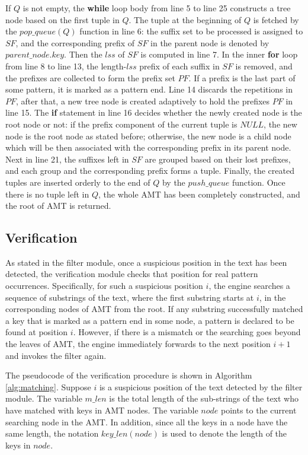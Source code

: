 \documentclass{article}
\begin{document}
If $Q$ is not empty, the \textbf{while} loop body from line 5 to line
25 constructs a tree node based on the first tuple in $Q$. The tuple
at the beginning of $Q$ is fetched by the $pop\_queue(Q)$ function in
line 6: the suffix set to be processed is assigned to $SF$, and the
corresponding prefix of $SF$ in the parent node is denoted by
$parent\_node.key$. Then the $lss$ of $SF$ is computed in line 7. In
the inner \textbf{for} loop from line 8 to line 13, the length-$lss$
prefix of each suffix in $SF$ is removed, and the prefixes are
collected to form the prefix set $PF$. If a prefix is the last part of
some pattern, it is marked as a pattern end. Line 14 discards the
repetitions in $PF$, after that, a new tree node is created adaptively
to hold the prefixes $PF$ in line 15. The \textbf{if} statement in
line 16 decides whether the newly created node is the root node or
not: if the prefix component of the current tuple is $NULL$, the new
node is the root node as stated before; otherwise, the new node is a
child node which will be then associated with the corresponding prefix
in its parent node. Next in line 21, the suffixes left in $SF$ are
grouped based on their lost prefixes, and each group and the
corresponding prefix forms a tuple. Finally, the created tuples are
inserted orderly to the end of $Q$ by the $push\_queue$ function. Once
there is no tuple left in $Q$, the whole AMT has been completely
constructed, and the root of AMT is returned.

\subsection{Verification}
\label{subsec:matching}

As stated in the filter module, once a suspicious position in the text
has been detected, the verification module checks that position for
real pattern occurrences. Specifically, for such a suspicious position
$i$, the engine searches a sequence of substrings of the text, where
the first substring starts at $i$, in the corresponding nodes of AMT
from the root. If any substring successfully matched a key that is
marked as a pattern end in some node, a pattern is declared to be
found at position $i$. However, if there is a mismatch or the
searching goes beyond the leaves of AMT, the engine immediately
forwards to the next position $i+1$ and invokes the filter again.

The pseudocode of the verification procedure is shown in Algorithm
\ref{alg:matching}. Suppose $i$ is a suspicious position of the text
detected by the filter module. The variable $m\_len$ is the total
length of the sub-strings of the text who have matched with keys in
AMT nodes. The variable $node$ points to the current searching node in
the AMT. In addition, since all the keys in a node have the same
length, the notation $key\_len(node)$ is used to denote the length of
the keys in $node$.
\end{document}
